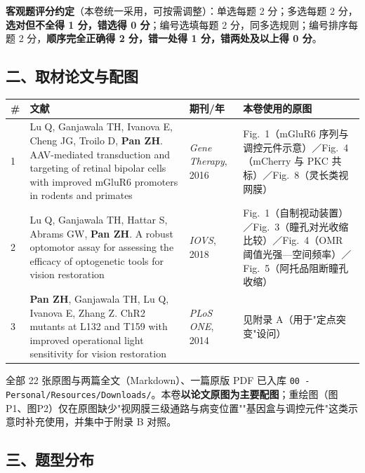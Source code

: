 \documentclass[UTF8,a4paper,11pt]{ctexart}
\begin{document}
\noindent\textbf{客观题评分约定}（本卷统一采用，可按需调整）：单选每题 2 分；多选每题 2 分，\textbf{选对但不全得 1 分，错选得 0 分}；编号选填每题 2 分，同多选规则；编号排序每题 2 分，\textbf{顺序完全正确得 2 分，错一处得 1 分，错两处及以上得 0 分}。

\subsection*{二、取材论文与配图}

\begin{longtable}{@{}p{0.4cm}p{5.6cm}p{2.4cm}p{6.0cm}@{}}
\toprule
\textbf{\#} & \textbf{文献} & \textbf{期刊/年} & \textbf{本卷使用的原图} \\
\midrule
\endhead
1 & Lu Q, Ganjawala TH, Ivanova E, Cheng JG, Troilo D, \textbf{Pan ZH}. AAV-mediated transduction and targeting of retinal bipolar cells with improved mGluR6 promoters in rodents and primates & \textit{Gene Therapy}, 2016 & Fig.~1（mGluR6 序列与调控元件示意）／Fig.~4（mCherry 与 PKC 共标）／Fig.~8（灵长类视网膜） \\
2 & Lu Q, Ganjawala TH, Hattar S, Abrams GW, \textbf{Pan ZH}. A robust optomotor assay for assessing the efficacy of optogenetic tools for vision restoration & \textit{IOVS}, 2018 & Fig.~1（自制视动装置）／Fig.~3（瞳孔对光收缩比较）／Fig.~4（OMR 阈值光强—空间频率）／Fig.~5（阿托品阻断瞳孔收缩） \\
3 & \textbf{Pan ZH}, Ganjawala TH, Lu Q, Ivanova E, Zhang Z. ChR2 mutants at L132 and T159 with improved operational light sensitivity for vision restoration & \textit{PLoS ONE}, 2014 & 见附录 A（用于"定点突变"设问） \\
\bottomrule
\end{longtable}

\noindent 全部 22 张原图与两篇全文（Markdown）、一篇原版 PDF 已入库 \texttt{00 - Personal/Resources/Downloads/}。本卷\textbf{以论文原图为主要配图}；重绘图（图P1、图P2）仅在原图缺少"视网膜三级通路与病变位置""基因盒与调控元件"这类示意时补充使用，并集中于附录 B 对照。

\subsection*{三、题型分布}
\end{document}
